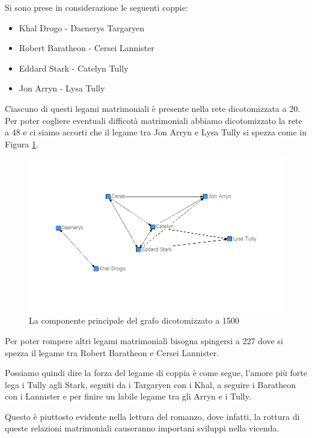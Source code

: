 \documentclass[a4paper]{article}
\begin{document}
Si sono prese in considerazione le seguenti coppie:

\begin{itemize}
\item Khal Drogo - Daenerys Targaryen
\item Robert Baratheon - Cersei Lannister
\item Eddard Stark - Catelyn Tully
\item Jon Arryn - Lysa Tully
\end{itemize}

Ciascuno di questi legami matrimoniali è presente nella rete dicotomizzata a 20.\\
Per poter cogliere eventuali difficotà matrimoniali abbiamo dicotomizzato la rete a 48 e ci siamo accorti che il legame tra Jon Arryn e Lysa Tully si spezza come in Figura \ref{fig:grafo-partito-1500}.\\
\begin{figure}[h]
\centering
\includegraphics[width=.9\textwidth]{picture/32.png}
\caption{La componente principale del grafo dicotomizzato a 1500}
\label{fig:grafo-partito-1500}
\end{figure}
Per poter rompere altri legami matrimoniali bisogna spingersi a 227 dove si spezza il legame tra Robert Baratheon e Cersei Lannister.

Possiamo quindi dire la forza del legame di coppia è come segue, l'amore più forte lega i Tully agli Stark, seguiti da i Targaryen con i Khal, a seguire i Baratheon con i Lannister e per finire un labile legame tra gli Arryn e i Tully.

Questo è piuttosto evidente nella lettura del romanzo, dove infatti, la rottura di queste relazioni matrimoniali causeranno importani sviluppi nella vicenda.
\end{document}

